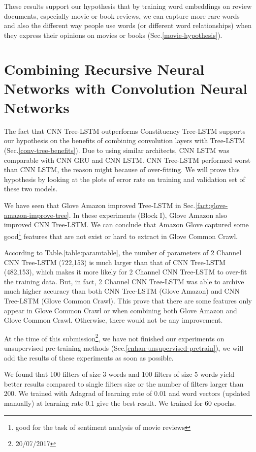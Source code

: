 These results support our hypothesis that by training word embeddings on review documents, especially movie or book reviews, we can capture more rare words and also the different way people use words (or different word relationships) when they express their opinions on movies or books (Sec.\ref{movie-hypothesis}). 
 
\section{Combining Recursive Neural Networks with Convolution Neural Networks}
The fact that CNN Tree-LSTM outperforms Constituency Tree-LSTM\cite{treeLSTM} supports our hypothesis on the benefits of combining convolution layers with Tree-LSTM (Sec.\ref{conv-tree-benefits}).\label{proved:tree-conv-benefit}
Due to using similar architects, CNN LSTM was comparable with CNN GRU and CNN LSTM\cite{cnn-rnn}. 
CNN Tree-LSTM performed worst than CNN LSTM, the reason might because of over-fitting.
We will prove this hypothesis by looking at the plots of error rate on training and validation set of these two models.

\label{proved:Amazon-adv-Common}
We have seen that Glove Amazon improved Tree-LSTM in Sec.\ref{fact:glove-amazon-improve-tree}.
In these experiments (Block I), Glove Amazon also improved CNN Tree-LSTM.
We can conclude that Amazon Glove captured some good\footnote{good for the task of sentiment analysis of movie reviews} features that are not exist or hard to extract in Glove Common Crawl.

According to Table.\ref{table:paramtable}, the number of parameters of 2 Channel CNN Tree-LSTM (722,153) is much larger than that of CNN Tree-LSTM (482,153), which makes it more likely for 2 Channel CNN Tree-LSTM to over-fit the training data.
But, in fact, 2 Channel CNN Tree-LSTM was able to archive much higher accuracy than both CNN Tree-LSTM (Glove Amazon) and CNN Tree-LSTM (Glove Common Crawl).
This prove that there are some features only appear in Glove Common Crawl or when combining both Glove Amazon and Glove Common Crawl.
Otherwise, there would not be any improvement.  

\label{unproved:unsupervised-good}
At the time of this submission\footnote{20/07/2017}, we have not finished our experiments on unsupervised pre-training methods (Sec.\ref{enhan-unsupervised-pretrain}), we will add the results of these experiments as soon as possible. 

We found that 100 filters of size 3 words and 100 filters of size 5 words yield better results compared to single filters size or the number of filters larger than 200. We trained with Adagrad of learning rate of 0.01 and word vectors (updated manually) at learning rate 0.1 give the best result. We trained for 60 epochs.
